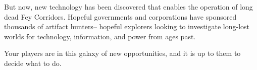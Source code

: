 But now, new technology has been discovered that enables the operation of long dead Fey Corridors. Hopeful governments and corporations have sponsored thousands of artifact hunters-- hopeful explorers looking to investigate long-lost worlds for technology, information, and power from ages past.

Your players are in this galaxy of new opportunities, and it is up to them to decide what to do.

